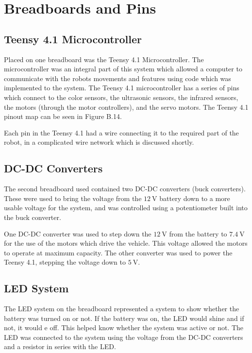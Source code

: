 \documentclass[11pt]{report}
\begin{document}
\section{Breadboards and Pins}\label{sec:breadboard-and-pins}
\subsection{Teensy 4.1 Microcontroller}
Placed on one breadboard was the Teensy 4.1 Microcontroller. The microcontroller was an integral part of this system which allowed a computer to communicate with the robots movements and features using code which was implemented to the system. The Teensy 4.1 microcontroller has a series of pins which connect to the color sensors, the ultrasonic sensors, the infrared sensors, the motors (through the motor controllers), and the servo motors. The Teensy 4.1 pinout map can be seen in Figure B.14. 
\par Each pin in the Teensy 4.1 had a wire connecting it to the required part of the robot, in a complicated wire network which is discussed shortly. 

\subsection{DC-DC Converters}
The second breadboard used contained two \gls{DC}-\gls{DC} converters (buck converters). These were used to bring the voltage from the $\SI{12}{\volt}$ battery down to a more usable voltage for the system, and was controlled using a potentiometer built into the buck converter. 
\par One DC-DC converter was used to step down the $\SI{12}{\volt}$ from the battery to $\SI{7.4}{\volt}$ for the use of the motors which drive the vehicle. This voltage allowed the motors to operate at maximum capacity. The other converter was used to power the Teensy 4.1, stepping the voltage down to $\SI{5}{\volt}$.

\subsection{LED System}
The \gls{LED} system on the breadboard represented a system to show whether the battery was turned on or not. If the battery was on, the \gls{LED} would shine and if not, it would e off. This helped know whether the system was active or not. The \gls{LED} was connected to the system using the voltage from the \gls{DC}-\gls{DC} converters and a resistor in series with the \gls{LED}.
\end{document}
